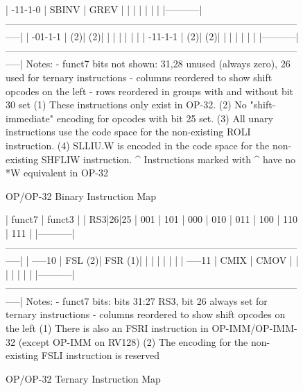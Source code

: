 \begin{figure}[t]
\begin{center}
\begin{minipage}{\linewidth}
\begin{verbnobox}[\tiny]
|  -11-1-0  |   SBINV   |    GREV   |           |           |           |           |           |           |
|-----------|-----------------------------------------------------------------------------------------------|
|  -01-1-1  |        (2)|        (2)|           |           |           |           |           |           |
|  -11-1-1  |        (2)|        (2)|           |           |           |           |           |           |
|-----------|-----------------------------------------------------------------------------------------------|
Notes:
- funct7 bits not shown: 31,28 unused (always zero), 26 used for ternary instructions
- columns reordered to show shift opcodes on the left
- rows reordered in groups with and without bit 30 set
(1) These instructions only exist in OP-32.
(2) No "shift-immediate" encoding for opcodes with bit 25 set.
(3) All unary instructions use the code space for the non-existing ROLI instruction.
(4) SLLIU.W is encoded in the code space for the non-existing SHFLIW instruction.
^ Instructions marked with ^ have no *W equivalent in OP-32
\end{verbnobox}
\end{minipage}
\end{center}
\caption{OP/OP-32 Binary Instruction Map}
\label{op-op32-bin}
\end{figure}

\begin{figure}[t]
\begin{center}
\begin{minipage}{\linewidth}
\begin{verbnobox}[\tiny]
|   funct7  |                                             funct3                                            |
| RS3|26|25 |    001    |    101    |    000    |    010    |    011    |    100    |    110    |    111    |
|-----------|-----------------------------------------------------------------------------------------------|
|  -----10  |    FSL (2)|    FSR (1)|           |           |           |           |           |           |
|  -----11  |    CMIX   |    CMOV   |           |           |           |           |           |           |
|-----------|-----------------------------------------------------------------------------------------------|
Notes:
- funct7 bits: bits 31:27 RS3, bit 26 always set for ternary instructions
- columns reordered to show shift opcodes on the left
(1) There is also an FSRI instruction in OP-IMM/OP-IMM-32 (except OP-IMM on RV128)
(2) The encoding for the non-existing FSLI instruction is reserved
\end{verbnobox}
\end{minipage}
\end{center}
\caption{OP/OP-32 Ternary Instruction Map}
\label{op-op32-tern}
\end{figure}

